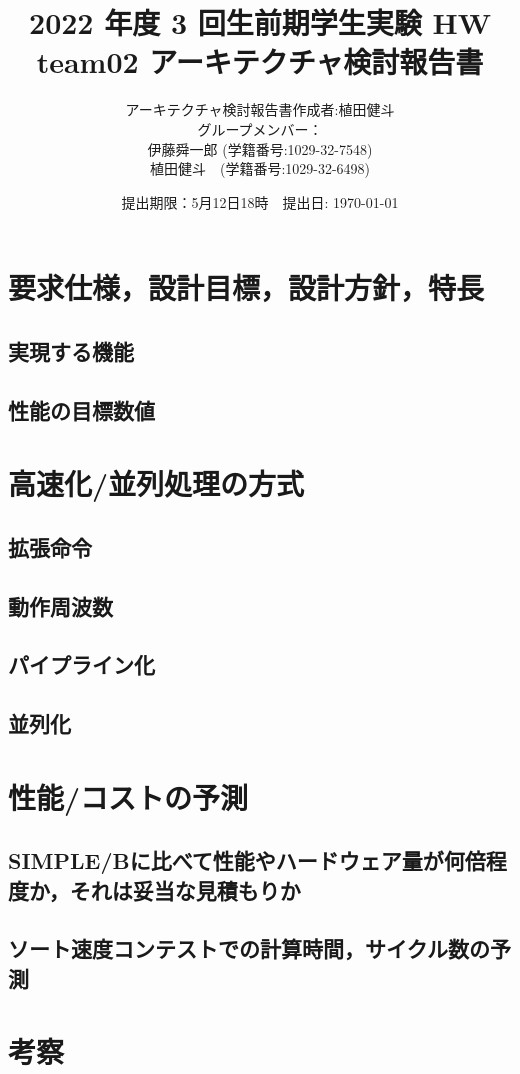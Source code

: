 \documentclass[a4j,titlepage]{jarticle}
\begin{document}
\title{2022 年度 3 回生前期学生実験 HW  \\ \bf team02 アーキテクチャ検討報告書}
\author{アーキテクチャ検討報告書作成者:植田健斗\\
グループメンバー：\\伊藤舜一郎 (学籍番号:1029-32-7548)
\\植田健斗　(学籍番号:1029-32-6498)}
\date{提出期限：5月12日18時　提出日: \today} %
\maketitle
\newpage

\section{要求仕様，設計目標，設計方針，特長}

\subsection{実現する機能}
\subsection{性能の目標数値}

\section{高速化/並列処理の方式}

\subsection{拡張命令}
\subsection{動作周波数}
\subsection{パイプライン化}
\subsection{並列化}


\section{性能/コストの予測}

\subsection{SIMPLE/Bに比べて性能やハードウェア量が何倍程度か，それは妥当な見積もりか}
\subsection{ソート速度コンテストでの計算時間，サイクル数の予測}

\section{考察}
\end{document}
